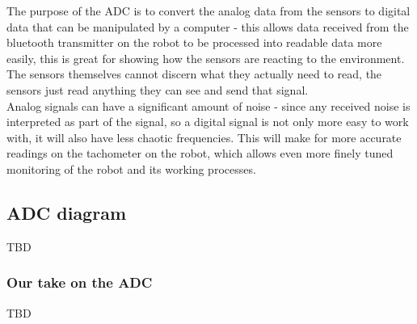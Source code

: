 The purpose of the ADC is to convert the analog data from the sensors to digital data that can be manipulated by a computer - this allows data received from the bluetooth transmitter on the robot to be processed into readable data more easily, this is great for showing how the sensors are reacting to the environment. The sensors themselves cannot discern what they actually need to read, the sensors just read anything they can see and send that signal. \\
Analog signals can have a significant amount of noise - since any received noise is interpreted as part of the signal, so a digital signal is not only more easy to work with, it will also have less chaotic frequencies. This will make for more accurate readings on the tachometer on the robot, which allows even more finely tuned monitoring of the robot and its working processes. \\

\subsection{ADC diagram} 
TBD

\subsubsection{Our take on the ADC}
TBD
